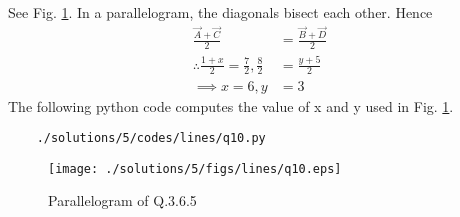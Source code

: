 See Fig. \ref{fig:3.6.5_qten}.	In a parallelogram, the diagonals bisect each other. Hence
	\begin{align}
		\frac{\vec{A}+\vec{C}}{2} &= \frac{\vec{B}+\vec{D}}{2}
		\\
\therefore \frac{1+x}{2} = \frac{7}{2}, \frac{8}{2} &= \frac{y+5}{2} \\
\implies x=6,y&=3
\end{align}
	The following python code computes the value of x and y used in Fig. \ref{fig:3.6.5_qten}.
	\begin{lstlisting}
	./solutions/5/codes/lines/q10.py
	\end{lstlisting}
	\begin{figure}[!ht]
	\centering
	\texttt{[image: ./solutions/5/figs/lines/q10.eps]}
	\caption{Parallelogram of Q.3.6.5}
	\label{fig:3.6.5_qten}	
	\end{figure}
	
		
